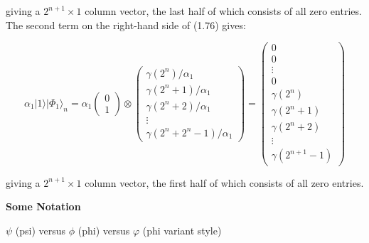 \documentclass{article}
\begin{document}
giving a $2^{n+1}\times 1$ column vector, the last half of which consists of all zero entries. The second term on the right-hand side of (1.76) gives:

\[
  \alpha_1 |1\rangle |\Phi_1\rangle_n
  =
  \alpha_1 \begin{pmatrix}0\\1\end{pmatrix}
  \otimes
  \begin{pmatrix}\gamma(2^n)/\alpha_1\\
                 \gamma(2^n + 1)/\alpha_1\\
                 \gamma(2^n + 2)/\alpha_1\\ \vdots \\
                 \gamma(2^n + 2^n - 1)/\alpha_1\end{pmatrix}
  =
  \begin{pmatrix}0 \\ 0 \\ \vdots \\ 0 \\
                 \gamma(2^n)\\
                 \gamma(2^n + 1)\\
                 \gamma(2^n +2)\\ \vdots \\
                 \gamma(2^{n + 1} - 1)
                 \end{pmatrix}
\]

giving a $2^{n+1}\times 1$ column vector, the first half of which consists of all zero entries.

\vspace{0.25in}

\textbf{\large Some Notation}\par

$\psi$ (psi) versus $\phi$ (phi) versus $\varphi$ (phi variant style)



\printbibliography
\end{document}
